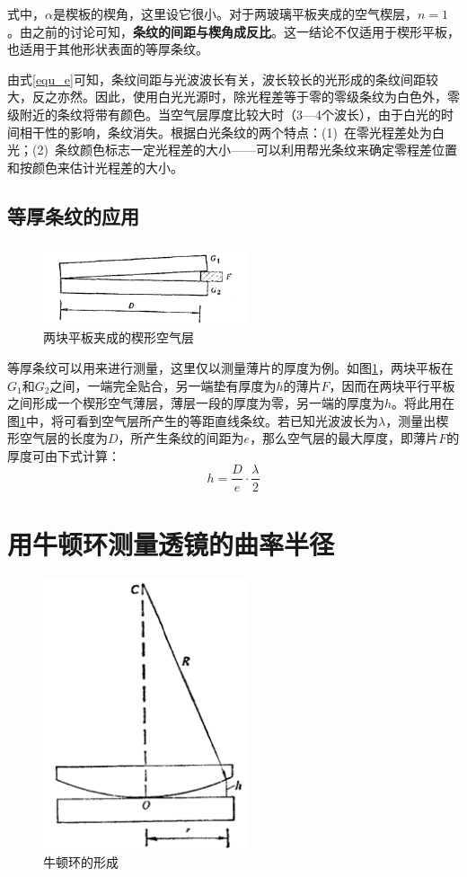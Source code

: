 \documentclass[UTF8]{ctexart}
\begin{document}
\noindent 式中，$ \alpha $是楔板的楔角，这里设它很小。对于两玻璃平板夹成的空气楔层，$ n=1 $。由之前的讨论可知，\textbf{条纹的间距与楔角成反比}。这一结论不仅适用于楔形平板，也适用于其他形状表面的等厚条纹。

	由式\ref{equ_e}可知，条纹间距与光波波长有关，波长较长的光形成的条纹间距较大，反之亦然。因此，使用白光光源时，除光程差等于零的零级条纹为白色外，零级附近的条纹将带有颜色。当空气层厚度比较大时（3—4个波长），由于白光的时间相干性的影响，条纹消失。根据白光条纹的两个特点：(1)\ 在零光程差处为白光；(2)\ 条纹颜色标志一定光程差的大小——可以利用帮光条纹来确定零程差位置和按颜色来估计光程差的大小。
	
	\subsection{等厚条纹的应用}
	\begin{figure}
		\includegraphics[width=6cm]{xie_rule.png}
		\caption{两块平板夹成的楔形空气层}
		\label{figure_xie_rule}
	\end{figure}
	
	等厚条纹可以用来进行测量，这里仅以测量薄片的厚度为例。如图\ref{figure_xie_rule}，两块平板在$ G_{1} $和$ G_{2} $之间，一端完全贴合，另一端垫有厚度为$ h $的薄片$ F $，因而在两块平行平板之间形成一个楔形空气薄层，薄层一段的厚度为零，另一端的厚度为$ h $。将此用在图\ref{figure_xie_rule}中，将可看到空气层所产生的等距直线条纹。若已知光波波长为$ \lambda $，测量出楔形空气层的长度为$ D $，所产生条纹的间距为$ e $，那么空气层的最大厚度，即薄片$ F $的厚度可由下式计算：
	\begin{equation}
		h=\frac{D}{e} \cdot \frac{\lambda}{2}
	\end{equation}
	
	\section{用牛顿环测量透镜的曲率半径}
	\begin{figure}
		\includegraphics[width=6cm]{Newton_circle.png}
		\caption{牛顿环的形成}
		\label{figure_Newton_circle}
	\end{figure}
\end{document}
